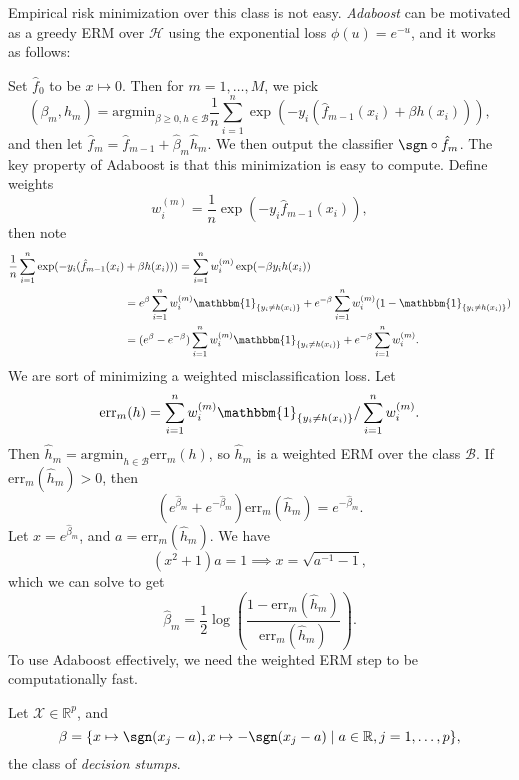 \documentclass[12pt]{article}
\begin{document}
Empirical risk minimization over this class is not easy. \emph{Adaboost} can be motivated as a greedy ERM over $\mathcal{H}$ using the exponential loss $\phi(u) = e^{-u}$, and it works as follows:

Set $\hat f_0$ to be $x \mapsto 0$. Then for $m = 1, \ldots, M$, we pick
\[
	(\beta_m, \hat h_m) = \mathrm{argmin}_{\beta \geq 0, h \in \mathcal{B}} \frac{1}{n} \sum_{i = 1}^n \exp (- y_i(\hat f_{m-1}(x_i) + \beta h(x_i))),
\]
and then let $\hat f_m = \hat f_{m-1} + \hat \beta_m \hat h_m$. We then output the classifier $\sgn \circ \hat f_m$. The key property of Adaboost is that this minimization is easy to compute. Define weights
\[
w_i^{(m)} = \frac{1}{n} \exp (-y_i \hat f_{m-1} (x_i)),
\]
then note
\begin{align*}
	\frac{1}{n} \sum_{i = 1}^n \exp(-y_i(\hat f_{m-1}(x_i) &+ \beta h(x_i))) = \sum_{i = 1}^n w_i^{(m)} \exp(- \beta y_i h(x_i)) \\
	&= e^{\beta} \sum_{i = 1}^n w_i^{(m)} \mathbbm{1}_{\{y_i \neq h(x_i)\}} + e^{-\beta} \sum_{i = 1}^n w_i^{(m)} (1 - \mathbbm{1}_{\{y_i \neq h(x_i)\}}) \\
	&= (e^\beta - e^{-\beta}) \sum_{i = 1}^n w_i^{(m)} \mathbbm{1}_{\{y_i \neq h(x_i)\}} + e^{-\beta} \sum_{i = 1}^n w_i^{(m)}.
\end{align*}
We are sort of minimizing a weighted misclassification loss. Let
\[
	\mathrm{err}_m(h) = \sum_{i = 1}^n w_i^{(m)} \mathbbm{1}_{\{y_i \neq h(x_i)\}} / \sum_{i = 1}^n w_i^{(m)}.
\]
Then $\hat h_m = \mathrm{argmin}_{h \in \mathcal{B}} \mathrm{err}_m(h)$, so $\hat h_m$ is a weighted ERM over the class $\mathcal{B}$. If $\mathrm{err}_m(\hat h_m) > 0$, then
\[
	(e^{\hat \beta_m} + e^{-\hat \beta_m}) \mathrm{err}_m(\hat h_m) = e^{- \hat \beta_m}.
\]
Let $x = e^{\hat \beta_m}$, and $a = \mathrm{err}_m(\hat h_m)$. We have
\[
	(x^2 + 1)a = 1 \implies x = \sqrt{a^{-1} - 1},
\]
which we can solve to get
\[
\hat \beta_m = \frac{1}{2} \log \left( \frac{1 - \mathrm{err}_m(\hat h_m)}{\mathrm{err}_m(\hat h_m)} \right).
\]
To use Adaboost effectively, we need the weighted ERM step to be computationally fast.

\begin{exbox}
	Let $\mathcal{X} \in \mathbb{R}^p$, and
	\[
		\beta = \{x \mapsto \sgn(x_j- a), x \mapsto - \sgn(x_j - a) \mid a \in \mathbb{R}, j = 1, \ldots, p\},
	\]
	the class of \emph{decision stumps}.
\end{exbox}

\end{document}
